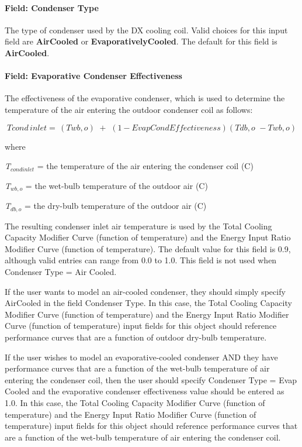 \paragraph{Field: Condenser Type}\label{field-condenser-type-4}

The type of condenser used by the DX cooling coil. Valid choices for this input field are \textbf{AirCooled} or \textbf{EvaporativelyCooled}. The default for this field is \textbf{AirCooled}.

\paragraph{Field: Evaporative Condenser Effectiveness}\label{field-evaporative-condenser-effectiveness-1}

The effectiveness of the evaporative condenser, which is used to determine the temperature of the air entering the outdoor condenser coil as follows:

\begin{equation}
Tcond\,inlet = \,\left( {Twb,o} \right)\,\, + \,\,\left( {1 - EvapCondEffectiveness} \right)\left( {Tdb,o\,\, - Twb,o} \right)
\end{equation}

where

\emph{T\(_{cond inlet}\)} = the temperature of the air entering the condenser coil (C)

\emph{T\(_{wb,o}\)} = the wet-bulb temperature of the outdoor air (C)

\emph{T\(_{db,o}\)} = the dry-bulb temperature of the outdoor air (C)

The resulting condenser inlet air temperature is used by the Total Cooling Capacity Modifier Curve (function of temperature) and the Energy Input Ratio Modifier Curve (function of temperature). The default value for this field is 0.9, although valid entries can range from 0.0 to 1.0. This field is not used when Condenser Type = Air Cooled.

If the user wants to model an air-cooled condenser, they should simply specify AirCooled in the field Condenser Type. In this case, the Total Cooling Capacity Modifier Curve (function of temperature) and the Energy Input Ratio Modifier Curve (function of temperature) input fields for this object should reference performance curves that are a function of outdoor dry-bulb temperature.

If the user wishes to model an evaporative-cooled condenser AND they have performance curves that are a function of the wet-bulb temperature of air entering the condenser coil, then the user should specify Condenser Type = Evap Cooled and the evaporative condenser effectiveness value should be entered as 1.0. In this case, the Total Cooling Capacity Modifier Curve (function of temperature) and the Energy Input Ratio Modifier Curve (function of temperature) input fields for this object should reference performance curves that are a function of the wet-bulb temperature of air entering the condenser coil.


